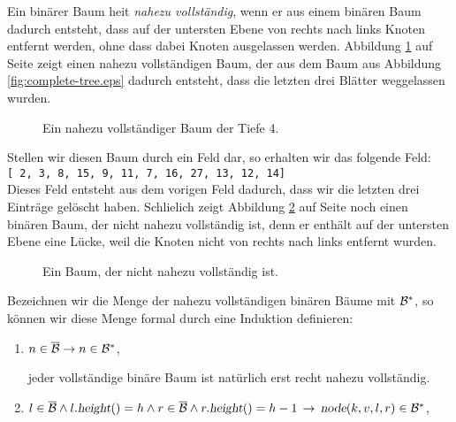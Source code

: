 \begin{enumerate}
      Ein bin\"arer Baum hei\3t \emph{nahezu vollst\"andig}, wenn er aus einem bin\"aren Baum
      dadurch entsteht, dass auf der untersten Ebene von rechts nach links Knoten entfernt
      werden, ohne dass dabei Knoten ausgelassen werden.  Abbildung
      \ref{fig:nearly-complete-tree.eps} auf Seite \pageref{fig:nearly-complete-tree.eps}
      zeigt einen nahezu vollst\"andigen Baum, der aus dem Baum aus Abbildung
      \ref{fig:complete-tree.eps} dadurch entsteht, dass die letzten drei Bl\"atter
      weggelassen wurden.

      \begin{figure}[!ht]
        \centering
        \caption{Ein nahezu vollst\"andiger Baum der Tiefe 4.}
        \label{fig:nearly-complete-tree.eps}
      \end{figure}
      
      Stellen wir diesen Baum durch ein Feld dar, so erhalten wir das folgende Feld:
      \\[0.2cm]
      \hspace*{1.3cm}
      \texttt{[ 2, 3, 8, 15, 9, 11, 7, 16, 27, 13, 12, 14]} 
      \\[0.2cm]
      Dieses Feld entsteht aus dem vorigen Feld dadurch, dass wir die letzten drei
      Eintr\"age gel\"oscht haben.  Schlie\3lich zeigt Abbildung
      \ref{fig:not-nearly-complete-tree.eps} auf Seite
      \pageref{fig:not-nearly-complete-tree.eps} noch einen bin\"aren Baum, der nicht nahezu
      vollst\"andig ist, denn er enth\"alt auf der untersten Ebene eine L\"ucke, weil die Knoten
      nicht von rechts nach links entfernt wurden.

      \begin{figure}[!ht]
        \centering
        \caption{Ein Baum, der nicht nahezu vollst\"andig ist.}
        \label{fig:not-nearly-complete-tree.eps}
      \end{figure}

      Bezeichnen wir die Menge der nahezu vollst\"andigen bin\"aren B\"aume mit $\mathcal{B}^*$, so
      k\"onnen wir diese Menge formal durch eine Induktion definieren:
      \begin{enumerate}
      \item $n \in \overline{\mathcal{B}} \rightarrow n \in \mathcal{B}^*$,

            jeder vollst\"andige bin\"are Baum ist nat\"urlich erst recht nahezu vollst\"andig.
      \item $l \in \overline{\mathcal{B}} \wedge l.\textsl{height}() = h \wedge r \in \overline{\mathcal{B}}
             \wedge r.\textsl{height}() = h-1 \,\rightarrow\,
             \textsl{node}(k,v,l,r) \in \mathcal{B}^*$,


\end{enumerate}
\end{enumerate}
